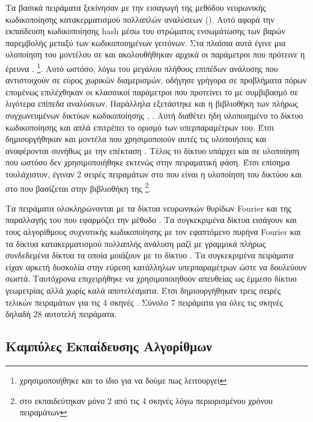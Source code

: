     Τα βασικά πειράματα ξεκίνησαν με την εισαγωγή της μεθόδου νευρωνικής κωδικοποίησης κατακερματισμού πολλαπλών αναλύσεων (). Αυτό αφορά την εκπαίδευση κωδικοποίησης hash μέσω του στρώματος ενσωμάτωσης των βαρών παρεμβολής μεταξύ των κωδικοποιημένων γειτόνων. Στα πλαίσια αυτά έγινε μια υλοποίηση του μοντέλου σε  και ακολουθήθηκαν αρχικά οι παράμετροι που πρότεινε η έρευνα  \cite{mueller2022instant}. \footnote{χρησιμοποιήθηκε και το ίδιο  για να δούμε πως λειτουργεί}. Αυτό ωστόσο, λόγω του μεγάλου πλήθους επιπέδων ανάλυσης που αντιστοιχούν σε εύρος χωρικών διαμερισμών, οδήγησε γρήγορα σε προβλήματα πόρων επομένως επιλέχθηκαν οι κλασσικοί παράμετροι που προτείνει το  με συμβιβασμό σε λιγότερα επίπεδα αναλύσεων. Παράλληλα εξετάστηκε και η βιβλιοθήκη των πλήρως συγχωνευμένων δικτύων κωδικοποίησης , \cite{tinycudann}. Αυτή διαθέτει ήδη υλοποιημένο το δίκτυο  κωδικοποίησης  και απλά επιτρέπει το ορισμό των υπερπαραμέτρων του. Έτσι δημιουργήθηκαν και μοντέλα που  χρησιμοποιούν αυτές τις υλοποιήσεις και αναφέρονται συνήθως με την επέκταση . Τέλος το δίκτυο  υπάρχει και σε υλοποίηση  που ωστόσο δεν χρησιμοποιήθηκε εκτενώς στην πειραματική φάση. Έτσι επίσημα τουλάχιστον, έγιναν 2 σειρές πειραμάτων στο  που είναι η  υλοποίηση του δικτύου και στο  που βασίζεται στην βιβλιοθήκη της  \footnote{στο  εκπαιδεύτηκαν μόνο 2 από τις 4 σκηνές λόγω περιορισμένου χρόνου πειραμάτων}.

    \nobreak
    Τα πειράματα ολοκληρώνονται με τα δίκτυα νευρωνικών θυρίδων Fourier και της παραλλαγής του που εφαρμόζει την μέθοδο . Τα συγκεκριμένα δίκτυα εισάγουν και τους αλγορίθμους συχνοτικής κωδικοποίησης με τον εφαπτόμενο πυρήνα Fourier και τα δίκτυα κατακερματισμού πολλαπλής ανάλυση  μαζί με γραμμικά πλήρως συνδεδεμένα δίκτυα τα οποία μοιάζουν με το δίκτυο  \cite{sitzmann2019siren}. Τα συγκεκριμένα πειράματα είχαν αρκετή δυσκολία στην εύρεση κατάλληλων υπερπαραμέτρων ώστε να δουλεύουν σωστά. Ταυτόχρονα επιχειρήθηκε να χρησιμοποιηθούν απευθείας ως έμμεσο δίκτυο γεωμετρίας αλλά χωρίς καλά αποτελέσματα. Έτσι δημιουργήθηκαν τρεις σειρές τελικών πειραμάτων για τις 4 σκηνές .  Σύνολο 7 πειράματα για όλες τις σκηνές δηλαδή 28 αυτοτελή πειράματα.
\subsection{Καμπύλες Εκπαίδευσης Αλγορίθμων}
